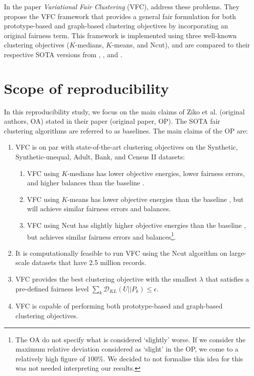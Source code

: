 In the paper \textit{Variational Fair Clustering} (VFC), \citep{ziko2021variational} address these problems. They propose the VFC framework that provides a general fair formulation for both prototype-based and graph-based clustering objectives by incorporating an original fairness term. This framework is implemented using three well-known clustering objectives ($K$-medians, $K$-means, and Ncut), and are compared to their respective SOTA versions from \citep{backurs2019scalable}, \citep{bera2019fair}, and \citep{kleindessner2019guarantees}.


\section{Scope of reproducibility}
\label{sec:scope}
In this reproducibility study, we focus on the main claims of Ziko et al. (original authors, OA) stated in their paper (original paper, OP). The SOTA fair clustering algorithms are referred to as baselines. The main claims of the OP are:

\begin{enumerate}[start=1, noitemsep, label={Claim \arabic*}]
    \item\label{claim:1} VFC is on par with state-of-the-art clustering objectives on the Synthetic, Synthetic-unequal, Adult, Bank, and Census II datasets:
    \begin{enumerate}[noitemsep, label=\alph*]
        \item VFC using $K$-medians has lower objective energies, lower fairness errors, and higher balances than the baseline \citep{backurs2019scalable}. \label{claim:1a}
        \item VFC using $K$-means has lower objective energies than the baseline \citep{bera2019fair}, but will achieve similar fairness errors and balances. \label{claim:1b}
        \item VFC using Ncut has slightly higher objective energies than the baseline \citep{kleindessner2019guarantees}, but achieves similar fairness errors and balances\footnote{The OA do not specify what is considered `slightly' worse. If we consider the maximum relative deviation considered as `slight' in the OP, we come to a relatively high figure of $100\%$. We decided to not formalise this idea for this was not needed interpreting our results.}. \label{claim:1c}
    \end{enumerate}
    \item\label{claim:2} It is computationally feasible to run VFC using the Ncut algorithm on large-scale datasets that have 2.5 million records.
    \item\label{claim:3} VFC provides the best clustering objective with the smallest $\lambda$ that satisfies a pre-defined fairness level $\sum_k \mathcal{D}_{KL}(U||P_k)\leq \epsilon$.
    \item\label{claim:4} VFC is capable of performing both prototype-based and graph-based clustering objectives.
\end{enumerate}

